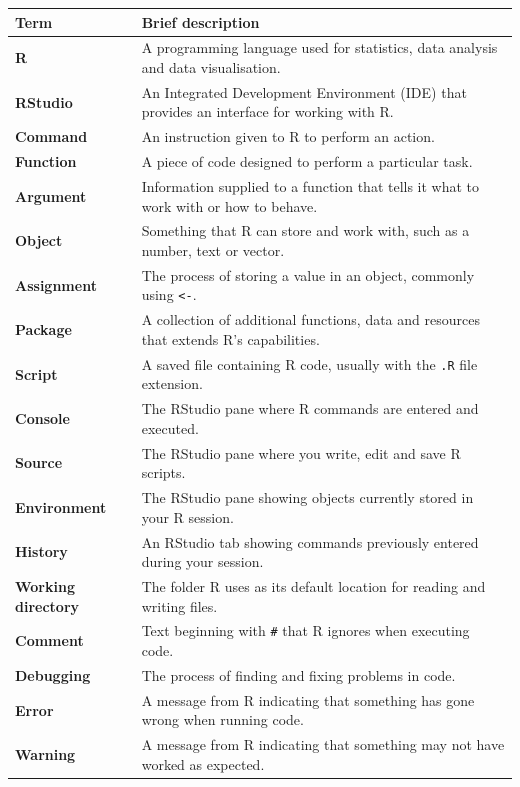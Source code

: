 \documentclass[
]{book}
\begin{document}
\begin{longtable}[]{@{}
  >{\raggedright\arraybackslash}p{}
  >{\raggedright\arraybackslash}p{}@{}}
\toprule\noalign{}
\begin{minipage}[b]{\linewidth}\raggedright
Term
\end{minipage} & \begin{minipage}[b]{\linewidth}\raggedright
Brief description
\end{minipage} \\
\midrule\noalign{}
\endhead
\bottomrule\noalign{}
\endlastfoot
\textbf{R} & A programming language used for statistics, data analysis and data visualisation. \\
\textbf{RStudio} & An Integrated Development Environment (IDE) that provides an interface for working with R. \\
\textbf{Command} & An instruction given to R to perform an action. \\
\textbf{Function} & A piece of code designed to perform a particular task. \\
\textbf{Argument} & Information supplied to a function that tells it what to work with or how to behave. \\
\textbf{Object} & Something that R can store and work with, such as a number, text or vector. \\
\textbf{Assignment} & The process of storing a value in an object, commonly using \texttt{\textless{}-}. \\
\textbf{Package} & A collection of additional functions, data and resources that extends R's capabilities. \\
\textbf{Script} & A saved file containing R code, usually with the \texttt{.R} file extension. \\
\textbf{Console} & The RStudio pane where R commands are entered and executed. \\
\textbf{Source} & The RStudio pane where you write, edit and save R scripts. \\
\textbf{Environment} & The RStudio pane showing objects currently stored in your R session. \\
\textbf{History} & An RStudio tab showing commands previously entered during your session. \\
\textbf{Working directory} & The folder R uses as its default location for reading and writing files. \\
\textbf{Comment} & Text beginning with \texttt{\#} that R ignores when executing code. \\
\textbf{Debugging} & The process of finding and fixing problems in code. \\
\textbf{Error} & A message from R indicating that something has gone wrong when running code. \\
\textbf{Warning} & A message from R indicating that something may not have worked as expected. \\
\end{longtable}
\end{document}
